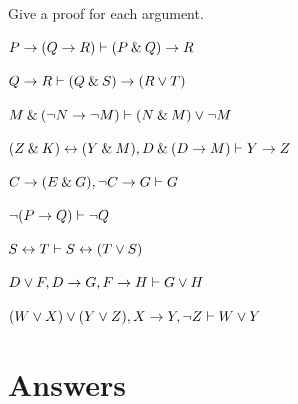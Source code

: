 \problempart
Give a proof for each argument.
\begin{earg}
\item $P \rightarrow (Q \rightarrow R) \vdash (P \mathbin{\&} Q) \rightarrow R$\smallskip
\item $Q \rightarrow R \vdash (Q \mathbin{\&} S) \rightarrow (R \vee T)$\smallskip 
\item $M \mathbin{\&} ({\neg} N \rightarrow {\neg} M) \vdash (N \mathbin{\&} M) \vee {\neg} M$\smallskip
\item $(Z\mathbin{\&} K)\leftrightarrow(Y\mathbin{\&} M), D\mathbin{\&}(D\rightarrow M) \vdash Y\rightarrow Z$\smallskip
\item $C\rightarrow(E\mathbin{\&} G), {\neg} C \rightarrow G \vdash G$\smallskip
\item ${\neg}(P \rightarrow Q) \vdash {\neg} Q$\smallskip
\item $S \leftrightarrow T \vdash S \leftrightarrow (T \vee S)$\smallskip 
\item $D \vee F, D \rightarrow G, F \rightarrow H \vdash G \vee H$\smallskip
\item $(W \vee X) \vee (Y \vee Z), X\rightarrow Y, {\neg} Z \vdash W\vee Y$
\end{earg}





\newpage

\section{Answers}
\setcounter{ProbPart}{0}

